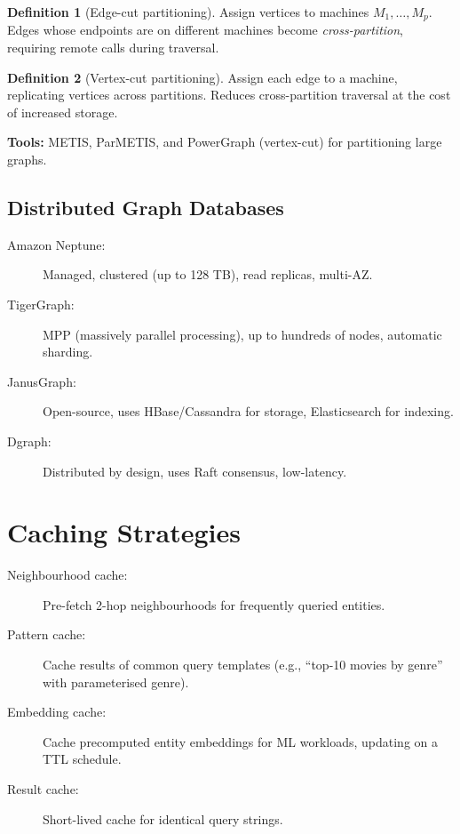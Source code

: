 \documentclass[11pt,a4paper,oneside,openany]{book}
\theoremstyle{definition}
\newtheorem{definition}{Definition}[chapter]
\theoremstyle{plain}
\theoremstyle{remark}
\begin{document}
\begin{definition}[Edge-cut partitioning]
	Assign vertices to machines $M_1, \dots, M_p$. Edges whose endpoints are on different machines become \emph{cross-partition}, requiring remote calls during traversal.
\end{definition}

\begin{definition}[Vertex-cut partitioning]
	Assign each edge to a machine, replicating vertices across partitions. Reduces cross-partition traversal at the cost of increased storage.
\end{definition}

\textbf{Tools:} METIS, ParMETIS, and PowerGraph (vertex-cut) for partitioning large graphs.

\subsection{Distributed Graph Databases}

\begin{description}
	\item[Amazon Neptune:] Managed, clustered (up to 128 TB), read replicas, multi-AZ.
	\item[TigerGraph:] MPP (massively parallel processing), up to hundreds of nodes, automatic sharding.
	\item[JanusGraph:] Open-source, uses HBase/Cassandra for storage, Elasticsearch for indexing.
	\item[Dgraph:] Distributed by design, uses Raft consensus, low-latency.
\end{description}

\section{Caching Strategies}\label{sec:caching}

\begin{description}
	\item[Neighbourhood cache:] Pre-fetch 2-hop neighbourhoods for frequently queried entities.
	\item[Pattern cache:] Cache results of common query templates (e.g., ``top-10 movies by genre'' with parameterised genre).
	\item[Embedding cache:] Cache precomputed entity embeddings for ML workloads, updating on a TTL schedule.
	\item[Result cache:] Short-lived cache for identical query strings.
\end{description}
\end{document}

